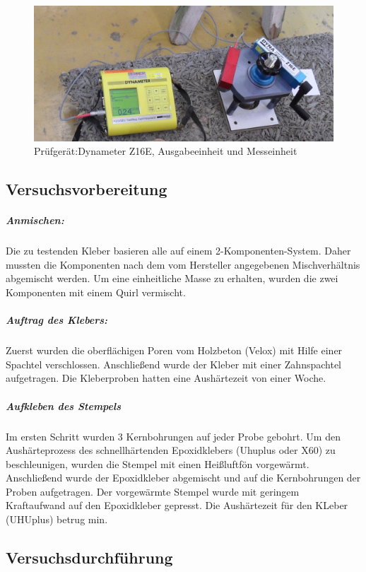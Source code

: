 \begin{figure}
\begin{center}
\includegraphics[scale =0.7]{Verbindungsmittel/kleber/Z16E.jpg}
\caption{ Prüfgerät:Dynameter Z16E, Ausgabeeinheit und Messeinheit}
\label{Z16E}
\end{center}
\end{figure}

\newpage{}
\subsection{Versuchsvorbereitung}
\subparagraph{Anmischen:}
Die zu testenden Kleber basieren alle auf einem 2-Komponenten-System. Daher mussten die Komponenten nach dem vom Hersteller  angegebenen Mischverhältnis abgemischt werden. Um eine einheitliche Masse zu erhalten, wurden die zwei Komponenten mit einem Quirl vermischt. 

\subparagraph{Auftrag des Klebers:}
Zuerst wurden die oberflächigen Poren vom Holzbeton (Velox) mit Hilfe einer Spachtel verschlossen. Anschließend wurde der Kleber mit einer Zahnspachtel aufgetragen. Die Kleberproben hatten eine Aushärtezeit von einer Woche.

\subparagraph{Aufkleben des Stempels}

Im ersten Schritt wurden 3 Kernbohrungen auf jeder Probe gebohrt. Um den Aushärteprozess des schnellhärtenden Epoxidklebers (Uhuplus oder X60) zu beschleunigen, wurden die Stempel mit einen Heißluftfön vorgewärmt. Anschließend wurde der Epoxidkleber abgemischt und auf die Kernbohrungen der Proben aufgetragen. Der vorgewärmte Stempel wurde mit geringem Kraftaufwand auf den Epoxidkleber gepresst. Die Aushärtezeit für den KLeber (UHUplus) betrug \unit [15]{min}.


\subsection{Versuchsdurchführung}

